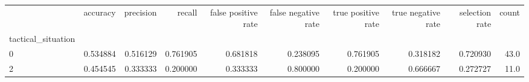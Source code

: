 \begin{tabular}{lrrrrrrrrr}
\toprule
{} &  accuracy &  precision &    recall &  false positive rate &  false negative rate &  true positive rate &  true negative rate &  selection rate &  count \\
tactical\_situation &           &            &           &                      &                      &                     &                     &                 &        \\
\midrule
0                  &  0.534884 &   0.516129 &  0.761905 &             0.681818 &             0.238095 &            0.761905 &            0.318182 &        0.720930 &   43.0 \\
2                  &  0.454545 &   0.333333 &  0.200000 &             0.333333 &             0.800000 &            0.200000 &            0.666667 &        0.272727 &   11.0 \\
\bottomrule
\end{tabular}
